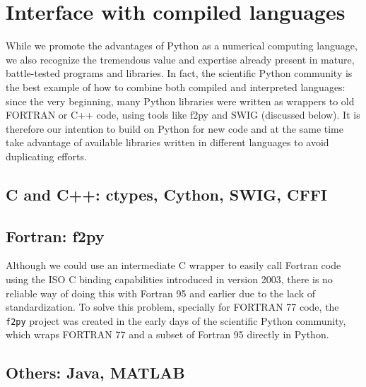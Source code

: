 \section{Interface with compiled languages}
\label{sec:interface}

While we promote the advantages of Python as a numerical computing language, we also recognize the tremendous value and expertise already present in mature, battle-tested programs and libraries. In fact, the scientific Python community is the best example of how to combine both compiled and interpreted languages: since the very beginning, many Python libraries were written as wrappers to old FORTRAN or C++ code, using tools like f2py and SWIG (discussed below)\cite{Millman_2011}. It is therefore our intention to build on Python for new code and at the same time take advantage of available libraries written in different languages to avoid duplicating efforts.

\subsection{C and C++: ctypes, Cython, SWIG, CFFI}

\subsection{Fortran: f2py}

Although we could use an intermediate C wrapper to easily call Fortran code using the ISO C binding capabilities introduced in version 2003, there is no reliable way of doing this with Fortran 95 and earlier due to the lack of standardization. To solve this problem, specially for FORTRAN 77 code, the \verb|f2py| project was created in the early days of the scientific Python community, which wraps FORTRAN 77 and a subset of Fortran 95 directly in Python\cite{peterson2009f2py}.

\subsection{Others: Java, MATLAB}